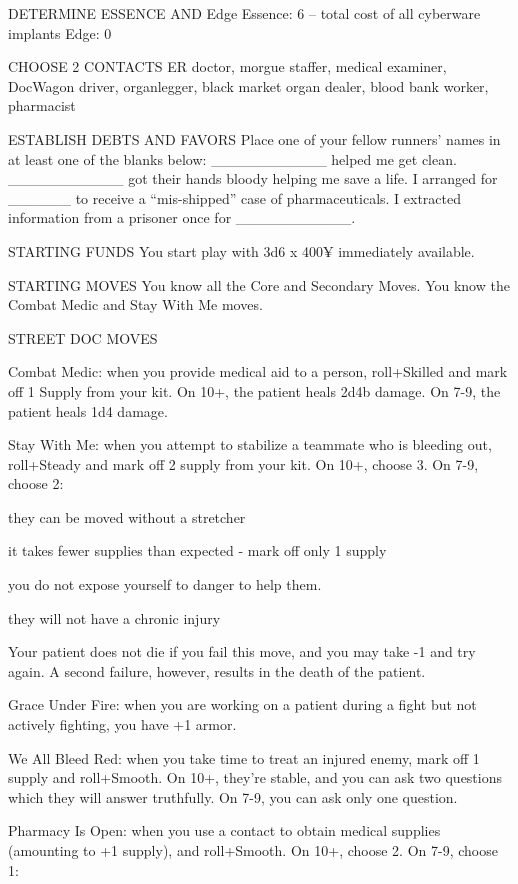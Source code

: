 DETERMINE ESSENCE AND Edge
Essence: 6 – total cost of all cyberware implants
Edge: 0

CHOOSE 2 CONTACTS
ER doctor, morgue staffer, medical examiner, DocWagon driver, organlegger, black market organ dealer, blood bank worker, pharmacist

ESTABLISH DEBTS AND FAVORS
Place one of your fellow runners’ names in at least one of the blanks below:
\_\_\_\_\_\_\_\_\_\_\_ helped me get clean.
\_\_\_\_\_\_\_\_\_\_\_ got their hands bloody helping me save a life.
I arranged for \_\_\_\_\_\_ to receive a “mis-shipped” case of pharmaceuticals.
I extracted information from a prisoner once for \_\_\_\_\_\_\_\_\_\_\_.

STARTING FUNDS
You start play with 3d6 x 400¥ immediately available.

STARTING MOVES
You know all the Core and Secondary Moves. You know the Combat Medic and Stay With Me moves.

STREET DOC MOVES

Combat Medic: when you provide medical aid to a person, roll+Skilled and mark off 1 Supply from your kit. On 10+, the patient heals 2d4b damage. On 7-9, the patient heals 1d4 damage.

Stay With Me: when you attempt to stabilize a teammate who is bleeding out, roll+Steady and mark off 2 supply from your kit. On 10+, choose 3. On 7-9, choose 2:

they can be moved without a stretcher

it takes fewer supplies than expected - mark off only 1 supply

you do not expose yourself to danger to help them.

they will not have a chronic injury

Your patient does not die if you fail this move, and you may take -1 and try again. A second failure, however, results in the death of the patient.

Grace Under Fire: when you are working on a patient during a fight but not actively fighting, you have +1 armor.

We All Bleed Red: when you take time to treat an injured enemy, mark off 1 supply and roll+Smooth. On 10+, they’re stable, and you can ask two questions which they will answer truthfully. On 7-9, you can ask only one question.

Pharmacy Is Open: when you use a contact to obtain medical supplies (amounting to +1 supply), and roll+Smooth. On 10+, choose 2. On 7-9, choose 1:


